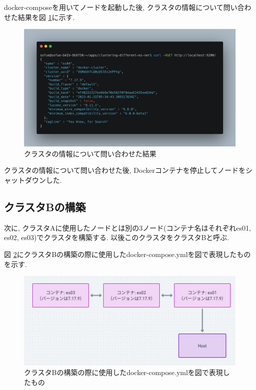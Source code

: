 docker-composeを用いてノードを起動した後, クラスタの情報について問い合わせた結果を図 \ref{p1-1}に示す.

\begin{figure}[h]
  \begin{center}
    \includegraphics[width=160mm]{sotu/figure/es04-cluster.png}
    \caption{クラスタの情報について問い合わせた結果}
    \label{p1-1}
  \end{center}
\end{figure}

クラスタの情報について問い合わせた後, Dockerコンテナを停止してノードをシャットダウンした.

\subsection{クラスタBの構築}

次に, クラスタAに使用したノードとは別の3ノード(コンテナ名はそれぞれes01, es02, es03)でクラスタを構築する. 以後このクラスタをクラスタBと呼ぶ.

図 \ref{d4}にクラスタBの構築の際に使用したdocker-compose.ymlを図で表現したものを示す.

\begin{figure}[h]
  \begin{center}
    \includegraphics[width=160mm]{sotu/figure/all-7.19.9.png}
    \caption{クラスタBの構築の際に使用したdocker-compose.ymlを図で表現したもの}
    \label{d4}
  \end{center}
\end{figure}

